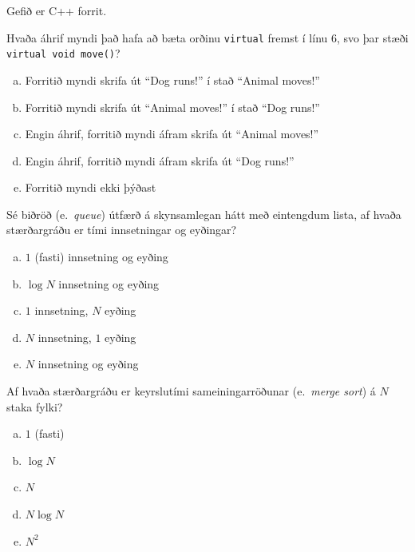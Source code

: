 \documentclass[addpoints]{exam}
\newcommand{\eng}[1]{(e.\ \emph{#1})}
\begin{document}
\begin{questions}
	\newpage

	\question[3]

	Gefið er C++ forrit.


	Hvaða áhrif myndi það hafa að bæta orðinu \texttt{virtual} fremst í línu 6, svo þar stæði \texttt{virtual void move()}?

	\begin{enumerate}[a)]
		\item Forritið myndi skrifa út ``Dog runs!'' í stað ``Animal moves!''
		\item Forritið myndi skrifa út ``Animal moves!'' í stað ``Dog runs!''
		\item Engin áhrif, forritið myndi áfram skrifa út ``Animal moves!''
		\item Engin áhrif, forritið myndi áfram skrifa út ``Dog runs!''
		\item Forritið myndi ekki þýðast
	\end{enumerate}

	\question[3]

	Sé biðröð \eng{queue} útfærð á skynsamlegan hátt með eintengdum lista, af hvaða stærðargráðu er tími innsetningar og eyðingar?

	\begin{enumerate}[a)]
		\item  $1$ (fasti) innsetning og eyðing
		\item  $\log N$ innsetning og eyðing
		\item  $1$ innsetning, $N$ eyðing
		\item  $N$ innsetning, $1$ eyðing
		\item  $N$ innsetning og eyðing
	\end{enumerate}

	\question[3]
	Af hvaða stærðargráðu er keyrslutími sameiningarröðunar \eng{merge sort} á $N$ staka fylki?

	\begin{multicols}{5}
		\begin{enumerate}[a)]
			\item $1$ (fasti)
			\item $\log N$
			\item $N$
			\item $N\log N$
			\item $N^2$
		\end{enumerate}
	\end{multicols}


\end{questions}
\end{document}
